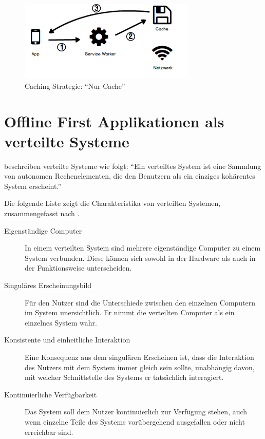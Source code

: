 \documentclass[a4paper, 12pt]{scrreprt}
\begin{document}
\begin{figure}[H]
	\centering
	\includegraphics[width=0.75\textwidth]{cacheonly.png}
	\caption{Caching-Strategie: \enquote{Nur Cache}}
	\label{fig:cachingCacheOnly}
\end{figure}

\section{Offline First Applikationen als verteilte Systeme}\label{sec:OfflineFirstVerteiteSysteme}
\citet{ArticleDistributedSystems} beschreiben verteilte Systeme wie folgt: \enquote{Ein verteiltes System ist eine Sammlung von autonomen Rechenelementen, die den Benutzern als ein einziges kohärentes System erscheint.}

Die folgende Liste zeigt die Charakteristika von verteilten Systemen, zusammengefasst nach \citet{BookDistributedSystemsDefinition}.

\begin{description}
\item[Eigenständige Computer] In einem verteilten System sind mehrere eigenständige Computer zu einem System verbunden. Diese können sich sowohl in der Hardware als auch in der Funktionsweise unterscheiden. 
\item[Singuläres Erscheinungsbild] Für den Nutzer sind die Unterschiede zwischen den einzelnen Computern im System unersichtlich. Er nimmt die verteilten Computer als ein einzelnes System wahr. 
\item[Konsistente und einheitliche Interaktion]
	Eine Konsequenz aus dem singulären Erscheinen ist, dass die Interaktion des Nutzers mit dem System immer gleich sein sollte, unabhängig davon, mit welcher Schnittstelle des Systems er tatsächlich interagiert. 
\item[Kontinuierliche Verfügbarkeit]
	Das System soll dem Nutzer kontinuierlich zur Verfügung stehen, auch wenn einzelne Teile des Systems vorübergehend ausgefallen oder nicht erreichbar sind.
\end{description}
\label{tab:charakteristikaDistributedSystem}
\end{document}
